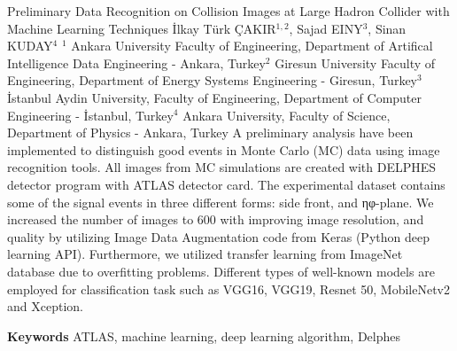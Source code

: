
    \begin{abstract_online}{Preliminary Data Recognition on Collision Images at Large Hadron Collider with Machine Learning Techniques}{%
        İlkay Türk ÇAKIR$^{1,2}$, Sajad EINY$^{3}$, Sinan KUDAY$^{4}$}{%
        }{%
        $^1$ Ankara University Faculty of Engineering, Department of Artifical Intelligence Data Engineering - Ankara, Turkey\newline{}$^2$ Giresun University Faculty of Engineering, Department of Energy Systems Engineering - Giresun, Turkey\newline{}$^3$ İstanbul Aydin University, Faculty of Engineering, Department of Computer Engineering - İstanbul, Turkey\newline{}$^4$ Ankara University, Faculty of Science, Department of Physics - Ankara, Turkey}
    A preliminary analysis have been implemented to distinguish good events in Monte Carlo (MC) data using image recognition tools. All images from MC simulations are created with DELPHES detector program with ATLAS detector card. The experimental dataset contains some of the signal events in three different forms: side front, and ηφ-plane. We increased the number of images to 600 with improving image resolution, and quality by utilizing Image Data Augmentation code from Keras (Python deep learning API). Furthermore, we utilized transfer learning from ImageNet database due to overfitting problems. Different types of well-known models are employed for classification task such as VGG16, VGG19, Resnet 50, MobileNetv2 and Xception.  
    
        \textbf{Keywords} \newline{}ATLAS, machine learning, deep learning algorithm, Delphes
    \end{abstract_online}
    